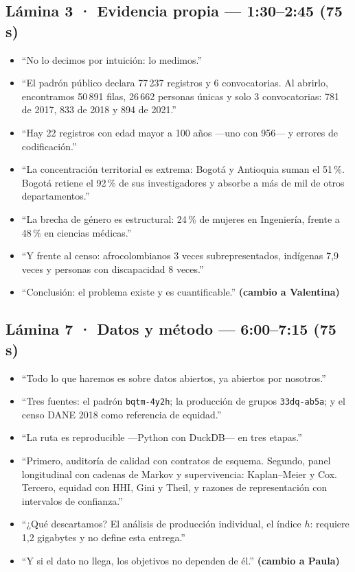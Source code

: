 \documentclass[10pt,a4paper]{article}
\newcommand{\tiempo}[1]{\textbf{\color{accent}#1}}
\begin{document}
\subsection{Lámina 3 · Evidencia propia — 1:30--2:45 (75 s)}
\begin{itemize}
  \item ``No lo decimos por intuición: lo medimos.''
  \item ``El padrón público declara 77\,237 registros y 6 convocatorias. Al
        abrirlo, encontramos 50\,891 filas, 26\,662 personas únicas y solo 3
        convocatorias: 781 de 2017, 833 de 2018 y 894 de 2021.''
  \item ``Hay 22 registros con edad mayor a 100 años —uno con 956— y errores de
        codificación.''
  \item ``La concentración territorial es extrema: Bogotá y Antioquia suman el
        51\,\%. Bogotá retiene el 92\,\% de sus investigadores y absorbe a más
        de mil de otros departamentos.''
  \item ``La brecha de género es estructural: 24\,\% de mujeres en Ingeniería,
        frente a 48\,\% en ciencias médicas.''
  \item ``Y frente al censo: afrocolombianos 3 veces subrepresentados,
        indígenas 7{,}9 veces y personas con discapacidad 8 veces.''
  \item ``Conclusión: el problema existe y es cuantificable.'' \hfill
        \tiempo{(cambio a Valentina)}
\end{itemize}

\subsection{Lámina 7 · Datos y método — 6:00--7:15 (75 s)}
\begin{itemize}
  \item ``Todo lo que haremos es sobre datos abiertos, ya abiertos por
        nosotros.''
  \item ``Tres fuentes: el padrón \texttt{bqtm-4y2h}; la producción de grupos
        \texttt{33dq-ab5a}; y el censo DANE 2018 como referencia de equidad.''
  \item ``La ruta es reproducible —Python con DuckDB— en tres etapas.''
  \item ``Primero, auditoría de calidad con contratos de esquema. Segundo,
        panel longitudinal con cadenas de Markov y supervivencia:
        Kaplan--Meier y Cox. Tercero, equidad con HHI, Gini y Theil, y razones
        de representación con intervalos de confianza.''
  \item ``¿Qué descartamos? El análisis de producción individual, el índice
        $h$: requiere 1{,}2 gigabytes y no define esta entrega.''
  \item ``Y si el dato no llega, los objetivos no dependen de él.'' \hfill
        \tiempo{(cambio a Paula)}
\end{itemize}
\end{document}
